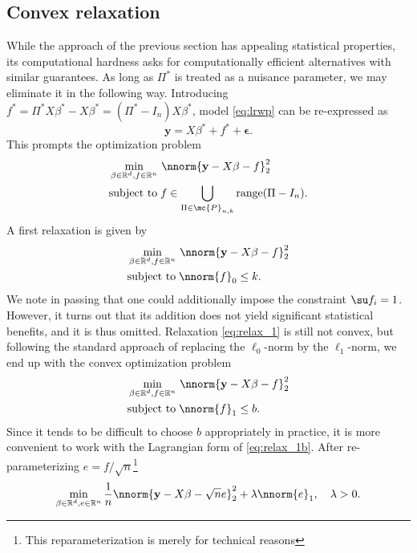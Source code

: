 \documentclass[11pt]{article}
\def\R{\mathbb{R}}
\def\y{\mathbf{y}}
\def\eps{\boldsymbol{\epsilon}}
\begin{document}
\subsection{Convex relaxation}\label{subsec:convex_relaxation}    
While the approach of the previous section has appealing statistical properties, its computational hardness asks for computationally efficient alternatives with similar guarantees. As long as $\Pi^*$ is treated as a nuisance parameter, we may eliminate it in the following way. Introducing $f^* = \Pi^* X \beta^* - X \beta^* = (\Pi^* - I_n) X \beta^*$, model \eqref{eq:lrwp} can be re-expressed as 
\begin{equation*}
\y = X \beta^* + f^* + \eps.
\end{equation*}
This prompts the optimization problem 
\begin{align*}%
&\min_{\beta \in \R^d, f \in \R^n} \, \nnorm{\y - X \beta - f}_2^2 \\
&\text{subject to} \;  f \in \bigcup_{\Pi \in \mc{P}_{n,k}} \text{range}(\Pi - I_n). 
\end{align*}
A first relaxation is given by 
\begin{align}\label{eq:relax_1} 
\begin{split}   
&\min_{\beta \in \R^d, f \in \R^n} \, \nnorm{\y - X \beta - f}_2^2  \\
&\text{subject to} \; \nnorm{f}_0 \leq k.   
\end{split}
\end{align}
We note in passing that one could additionally impose the constraint $\su f_i = 1$. However, it turns out that its addition does not yield significant statistical benefits, and it is thus omitted. 
Relaxation \eqref{eq:relax_1} is still not convex, but following the standard approach of replacing
the $\ell_0$-norm by the $\ell_1$-norm, we end up with the convex optimization problem 
\begin{align}\label{eq:relax_1b} 
\begin{split}
&\min_{\beta \in \R^d, f \in \R^n} \, \nnorm{\y - X \beta - f}_2^2  \\
&\text{subject to} \; \nnorm{f}_1 \leq b.   
\end{split}
\end{align}
Since it tends to be difficult to choose $b$ appropriately in practice, it is more convenient to work with the 
Lagrangian form of \eqref{eq:relax_1b}. After re-parameterizing $e = f / \sqrt{n}$\footnote{This reparameterization is merely for technical reasons} 
\begin{equation}\label{eq:relax_2}
 \min_{\beta \in \R^d, e \in \R^n} \frac{1}{n}\nnorm{\y - X \beta - \sqrt{n} e}_2^2 + \lambda \nnorm{e}_1, \quad \lambda > 0.
\end{equation}
\end{document}
